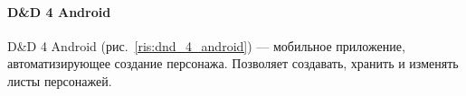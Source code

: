 \paragraph{D\&D 4 Android}
D\&D 4 Android (рис.~\ref{ris:dnd_4_android}) --- мобильное приложение, автоматизирующее создание персонажа. Позволяет создавать, хранить и изменять листы персонажей.

\begin{figure}[!h]
\begin{minipage}[h]{0.49\linewidth}
\end{minipage}
\begin{minipage}[h]{0.49\linewidth}

\end{minipage}
\end{figure}
